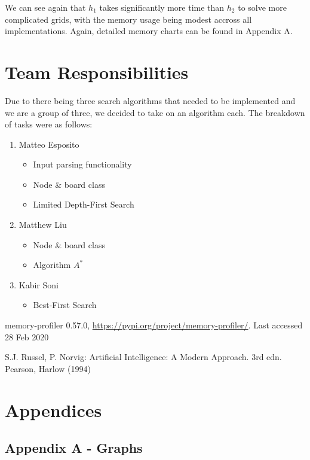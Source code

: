 \documentclass[runningheads]{llncs}
\begin{document}
We can see again that $h_1$ takes significantly more time than $h_2$ to solve more complicated grids, with the memory usage being modest accross all implementations. Again, detailed memory charts can be found in Appendix A.

\section{Team Responsibilities}

Due to there being three search algorithms that needed to be implemented and we are a group of three, we decided to take on an algorithm each. The breakdown of tasks were as follows:

\begin{enumerate}
    \item Matteo Esposito
    \begin{itemize}
        \item Input parsing functionality
        \item Node \& board class
        \item Limited Depth-First Search
    \end{itemize}
    \item Matthew Liu
    \begin{itemize}
        \item Node \& board class
        \item Algorithm $A^{*}$
    \end{itemize}
    \item Kabir Soni
    \begin{itemize}
        \item Best-First Search
    \end{itemize}
\end{enumerate}

\begin{thebibliography}{8}
memory-profiler 0.57.0, \url{https://pypi.org/project/memory-profiler/}. Last accessed 28 Feb 2020

S.J. Russel, P. Norvig: Artificial Intelligence: A Modern Approach. 3rd edn. Pearson, Harlow (1994)

\end{thebibliography}

\newpage

\section{Appendices}
\subsection{Appendix A - Graphs}
\end{document}

